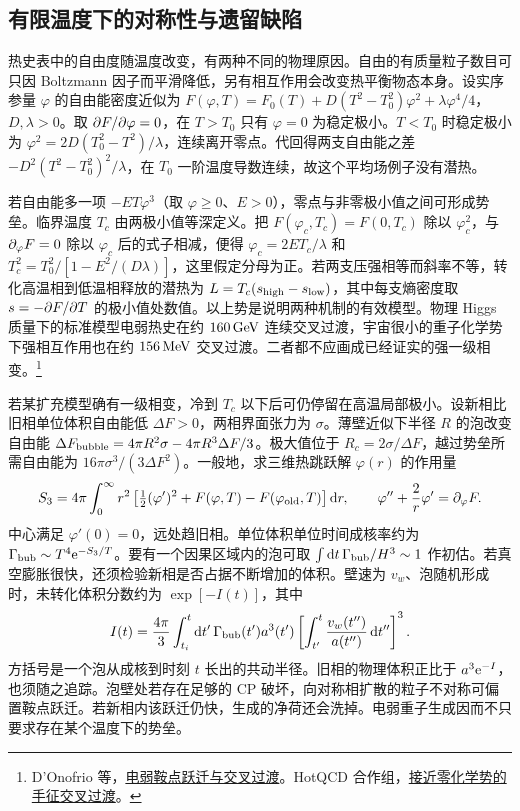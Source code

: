 \subsection{有限温度下的对称性与遗留缺陷}

热史表中的自由度随温度改变，有两种不同的物理原因。自由的有质量粒子数目可只因 Boltzmann 因子而平滑降低，另有相互作用会改变热平衡物态本身。设实序参量 $\varphi$ 的自由能密度近似为 $F(\varphi,T)=F_0(T)+D(T^2-T_0^2)\varphi^2+\lambda\varphi^4/4$，$D,\lambda>0$。取 $\partial F/\partial\varphi=0$，在 $T>T_0$ 只有 $\varphi=0$ 为稳定极小。$T<T_0$ 时稳定极小为 $\varphi^2=2D(T_0^2-T^2)/\lambda$，连续离开零点。代回得两支自由能之差 $-D^2(T^2-T_0^2)^2/\lambda$，在 $T_0$ 一阶温度导数连续，故这个平均场例子没有潜热。

若自由能多一项 $-E T\varphi^3$（取 $\varphi\geq0$、$E>0$），零点与非零极小值之间可形成势垒。临界温度 $T_c$ 由两极小值等深定义。把 $F(\varphi_c,T_c)=F(0,T_c)$ 除以 $\varphi_c^2$，与 $\partial_\varphi F=0$ 除以 $\varphi_c$ 后的式子相减，便得 $\varphi_c=2ET_c/\lambda$ 和 $T_c^2=T_0^2/[1-E^2/(D\lambda)]$，这里假定分母为正。若两支压强相等而斜率不等，转化高温相到低温相释放的潜热为 $L=T_c(s_{\rm high}-s_{\rm low})$，其中每支熵密度取 $s=-\partial F/\partial T$ 的极小值处数值。以上势是说明两种机制的有效模型。物理 Higgs 质量下的标准模型电弱热史在约 $160\,{\rm GeV}$ 连续交叉过渡，宇宙很小的重子化学势下强相互作用也在约 $156\,{\rm MeV}$ 交叉过渡。二者都不应画成已经证实的强一级相变。\footnote{D'Onofrio 等，\href{https://doi.org/10.1103/PhysRevLett.113.141602}{电弱鞍点跃迁与交叉过渡}。HotQCD 合作组，\href{https://arxiv.org/abs/1812.08235}{接近零化学势的手征交叉过渡}。}

若某扩充模型确有一级相变，冷到 $T_c$ 以下后可仍停留在高温局部极小。设新相比旧相单位体积自由能低 $\Delta F>0$，两相界面张力为 $\sigma$。薄壁近似下半径 $R$ 的泡改变自由能 $\Delta F_{\rm bubble}=4\pi R^2\sigma-4\pi R^3\Delta F/3$。极大值位于 $R_c=2\sigma/\Delta F$，越过势垒所需自由能为 $16\pi\sigma^3/(3\Delta F^2)$。一般地，求三维热跳跃解 $\varphi(r)$ 的作用量
\[
 S_3=4\pi\int_0^\infty r^2\left[\tfrac12(\varphi')^2+
 F(\varphi,T)-F(\varphi_{\rm old},T)\right]\dd r,\qquad
 \varphi''+\frac2r\varphi'=\partial_\varphi F .
\]
中心满足 $\varphi'(0)=0$，远处趋旧相。单位体积单位时间成核率约为 $\Gamma_{\rm bub}\sim T^4\mathrm{e}^{-S_3/T}$。要有一个因果区域内的泡可取 $\int\dd t\,\Gamma_{\rm bub}/H^3\sim1$ 作初估。若真空膨胀很快，还须检验新相是否占据不断增加的体积。壁速为 $v_w$、泡随机形成时，未转化体积分数约为 $\exp[-I(t)]$，其中
\begin{equation}\label{eq:cosmo-thermal-bubble-prob}
 I(t)=\frac{4\pi}{3}\int_{t_i}^t\dd t'\,\Gamma_{\rm bub}(t')a^3(t')
 \left[\int_{t'}^t\frac{v_w(t'')}{a(t'')}\,\dd t''\right]^3 .
\end{equation}
方括号是一个泡从成核到时刻 $t$ 长出的共动半径。旧相的物理体积正比于 $a^3\mathrm{e}^{-I}$，也须随之追踪。泡壁处若存在足够的 CP 破坏，向对称相扩散的粒子不对称可偏置鞍点跃迁。若新相内该跃迁仍快，生成的净荷还会洗掉。电弱重子生成因而不只要求存在某个温度下的势垒。

